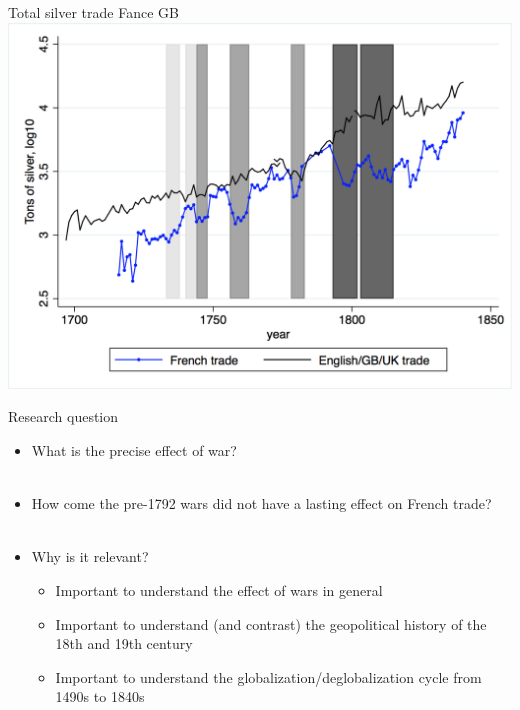\documentclass[11pt]{beamer}
\begin{document}
\begin{frame}{Total silver trade Fance GB}
\includegraphics[scale=.5]{Total_silver_trade_FRGB.png}
\end{frame}

\begin{frame}{Research question}
\begin{itemize}
\item{What is the precise effect of war?}\\~\\
\item{How come the pre-1792 wars did not have a lasting effect on French trade?}\\~\\
\item{Why is it relevant?}
\begin{itemize}
\item{Important to understand the effect of wars in general}
\item{Important to understand (and contrast) the geopolitical history of the 18th and 19th century}
\item{Important to understand the globalization/deglobalization cycle from 1490s to 1840s}
\end{itemize}
\end{itemize}
\end{frame}
\end{document}

